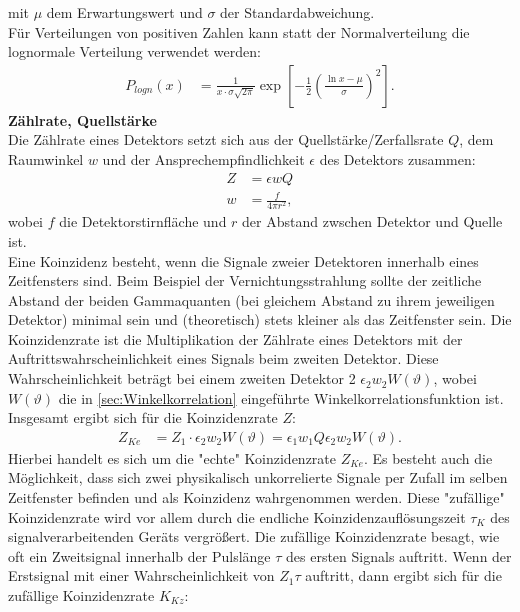 \documentclass[%
aps,
onecolumn,
11pt,
tightenlines,
nofootinbib,
superscriptaddress,
floatfix,
prd,
]{revtex4-2}
\begin{document}
mit $\mu$ dem Erwartungswert und $\sigma$ der Standardabweichung. \\
Für Verteilungen von positiven Zahlen kann statt der Normalverteilung die lognormale Verteilung verwendet werden:
\begin{align}
	\label{eq:lognormal}
	P_{logn}(x) &= \frac{1}{x \cdot \sigma \sqrt{2\pi}} \exp \left[ -\frac{1}{2} \left ( \frac{\ln x - \mu}{\sigma} \right )^2  \right].
\end{align}
\newpage
\noindent \textbf{Zählrate, Quellstärke}\\
Die Zählrate eines Detektors setzt sich aus der Quellstärke/Zerfallsrate $Q$, dem Raumwinkel $w$ und der Ansprechempfindlichkeit $\epsilon$ des Detektors zusammen:
\begin{align}
	Z &= \epsilon w Q \\
	w &= \frac{f}{4 \pi r^2} \nonumber,
\end{align}
wobei $f$ die Detektorstirnfläche und $r$ der Abstand zwschen Detektor und Quelle ist. \\
Eine Koinzidenz besteht, wenn die Signale zweier Detektoren innerhalb eines Zeitfensters sind. Beim Beispiel der Vernichtungsstrahlung sollte der zeitliche Abstand der beiden Gammaquanten (bei gleichem Abstand zu ihrem jeweiligen Detektor) minimal sein und (theoretisch) stets kleiner als das Zeitfenster sein. Die Koinzidenzrate ist die Multiplikation der Zählrate eines Detektors mit der Auftrittswahrscheinlichkeit eines Signals beim zweiten Detektor. Diese Wahrscheinlichkeit beträgt bei einem zweiten Detektor 2 $\epsilon_2w_2W(\vartheta)$, wobei $W(\vartheta)$ die in \ref{sec:Winkelkorrelation} eingeführte Winkelkorrelationsfunktion ist. Insgesamt ergibt sich für die Koinzidenzrate $Z$:
\begin{align}
	Z_{Ke} &= Z_1 \cdot \epsilon_2w_2W(\vartheta) = \epsilon_1 w_1 Q \epsilon_2 w_2 W(\vartheta).
\end{align}
Hierbei handelt es sich um die "echte" Koinzidenzrate $Z_{Ke}$. Es besteht auch die Möglichkeit, dass sich zwei physikalisch unkorrelierte Signale per Zufall im selben Zeitfenster befinden und als Koinzidenz wahrgenommen werden. Diese "zufällige" Koinzidenzrate wird vor allem durch die endliche Koinzidenzauflösungszeit $\tau_K$ des signalverarbeitenden Geräts vergrößert. Die zufällige Koinzidenzrate besagt, wie oft ein Zweitsignal innerhalb der Pulslänge $\tau$ des ersten Signals auftritt. Wenn der Erstsignal mit einer Wahrscheinlichkeit von $Z_1 \tau$ auftritt, dann ergibt sich für die zufällige Koinzidenzrate $K_{Kz}$:
\end{document}
